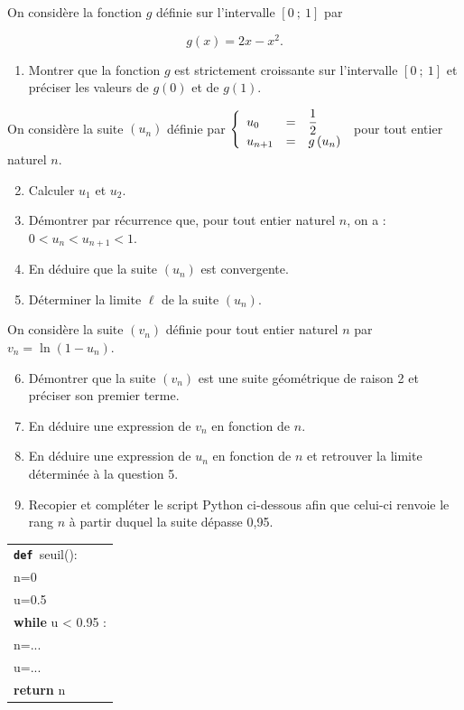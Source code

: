 
On considère la fonction $g$ définie sur l'intervalle $[0~;~1]$ par 

\[g(x) = 2x - x^{2}.\]

\smallskip

\begin{enumerate}
\item Montrer que la fonction $g$ est strictement croissante sur l'intervalle $[0~;~1]$ et préciser les valeurs de $g(0)$ et de $g(1)$.
\end{enumerate}

On considère la suite $\left(u_{n}\right)$ définie par $\left\{\begin{array}{l c l}u_{0}&=&\dfrac{1}{2}\\ u_{n+1}&=&g\left(u_{n}\right)\end{array}\right.$ pour tout entier naturel $n$.

\begin{enumerate}
\setcounter{enumi}{1}
\item Calculer $u_{1}$ et $u_{2}$.

\item Démontrer par récurrence que, pour tout entier naturel $n$, on a : $0 < u_{n} < u_{n+1}< 1$.
\item En déduire que la suite $\left(u_{n}\right)$ est convergente.
\item Déterminer la limite $\ell$ de la suite $\left(u_{n}\right)$.
\end{enumerate}

On considère la suite $\left(v_{n}\right)$ définie pour tout entier naturel $n$ par $v_{n}=\ln \left(1 - u_{n}\right)$.

\begin{enumerate}
\setcounter{enumi}{5}
\item Démontrer que la suite $\left(v_{n}\right)$ est une suite géométrique de raison 2 et préciser son premier terme.
\item En déduire une expression de $v_{n}$ en fonction de $n$.
\item En déduire une expression de $u_{n}$ en fonction de $n$ et retrouver la limite déterminée à la question 5.
\item Recopier et compléter le script Python ci-dessous afin que celui-ci renvoie le rang $n$ à partir duquel la suite dépasse 0,95.
\end{enumerate}

\begin{center}
\begin{tabular}{|>{\texttt} l|}\hline
\textbf{def }seuil():\\
\qquad n=0\\
\qquad u=0.5\\
\qquad \textbf{while} u < 0.95 :\\
\qquad \qquad n=...\\
\qquad \qquad u=...\\
\qquad \textbf{return} n\\ \hline
\end{tabular}
\end{center}
